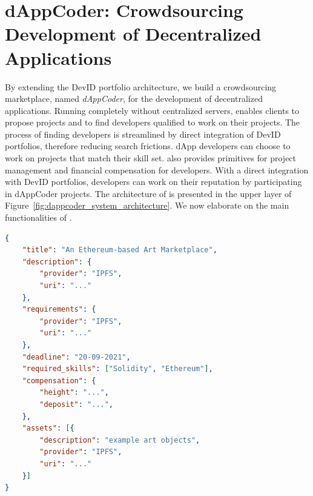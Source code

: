 \section{dAppCoder: Crowdsourcing Development of Decentralized Applications}
\label{sec:dappcoder}
By extending the DevID portfolio architecture, we build a crowdsourcing marketplace, named \emph{dAppCoder}, for the development of decentralized applications.
Running completely without centralized servers, \Dappcoder{} enables clients to propose projects and to find developers qualified to work on their projects.
The process of finding developers is streamlined by direct integration of DevID portfolios, therefore reducing search frictions.
dApp developers can choose to work on projects that match their skill set.
\Dappcoder{} also provides primitives for project management and financial compensation for developers.
With a direct integration with DevID portfolios, developers can work on their reputation by participating in dAppCoder projects.
The architecture of \Dappcoder{} is presented in the upper layer of Figure~\ref{fig:dappcoder_system_architecture}.
We now elaborate on the main functionalities of \Dappcoder{}.

\begin{lstlisting}[language=json,firstnumber=1,float=t,caption=A project offered in \Dappcoder{} (in JSON format).,label=lst:devid_project]
{
	"title": "An Ethereum-based Art Marketplace",
	"description": {
		"provider": "IPFS",
		"uri": "..."
	},
	"requirements": {
		"provider": "IPFS",
		"uri": "..."
	},
	"deadline": "20-09-2021",
	"required_skills": ["Solidity", "Ethereum"],
	"compensation": {
		"height": "...",
		"deposit": "...",
	},
	"assets": [{
		"description": "example art objects",
		"provider": "IPFS",
		"uri": "..."
	}]
}
\end{lstlisting}

